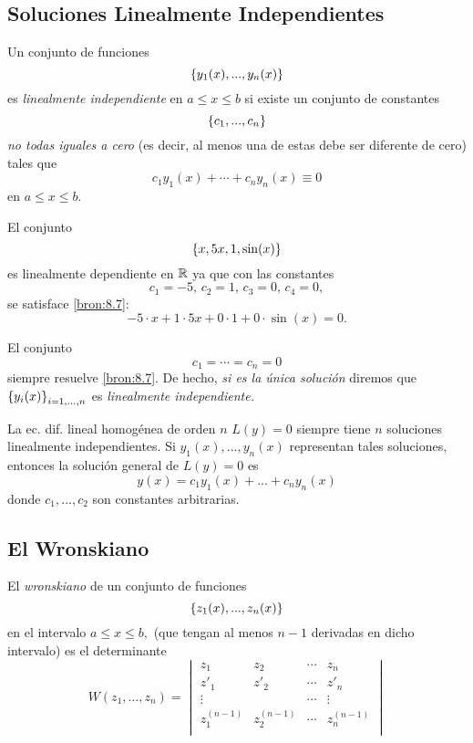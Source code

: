 \subsection{Soluciones Linealmente Independientes}


	Un conjunto de funciones
	$$
	\left\{ y_{1}(x),...,y_{n}(x) \right\}
	$$
	es \emph{linealmente independiente} en $a\leq x \leq b$ si existe un conjunto de constantes
	$$
	\left\{ c_{1}, ..., c_{n} \right\}
	$$ \emph{no todas iguales a cero} (es decir, al menos una de estas debe ser diferente de cero) tales que
	\[
		\label{bron:8.7}
		c_{1}y_{1}(x)+\cdots+c_{n}y_{n}(x)\equiv 0
	\]
	en $a\leq x \leq b.$



	\begin{problema}
		El conjunto
		$$
		\left\{ x, 5x, 1, \sin(x) \right\}
		$$es linealmente dependiente en $\mathbb{R}$ ya que con las constantes
		$$c_{1}=-5, \, c_{2}=1, \, c_{3}=0, \, c_{4}=0,$$ se satisface \eqref{bron:8.7}:
		$$
		-5\cdot x+1\cdot 5x+0\cdot 1+0\cdot \sin(x)=0.
		$$
	\end{problema}
	



	\begin{observacion}
		El conjunto $$c_{1}=\cdots =c_{n}=0$$ siempre resuelve \eqref{bron:8.7}. De hecho, \emph{si es la única soluci\'on}  diremos que $\left\{ y_{i}(x) \right\}_{i=1,...,n}$ es \emph{linealmente independiente.}
	\end{observacion}
	



	La ec. dif. lineal homog\'enea de orden $n$ $L(y)=0$ siempre tiene $n$ soluciones linealmente independientes. Si $y_{1}(x),...,y_{n}(x)$ representan tales soluciones, entonces la soluci\'on general de $L(y)=0$ es
	\[
		\label{bron:8.8}
		y(x)=c_{1}y_{1}(x)+...+c_{n}y_{n}(x)
	\]
	donde $c_{1},...,c_{2}$ son constantes arbitrarias.


\subsection{El Wronskiano}


	El \emph{wronskiano} de un conjunto de funciones
	$$
	\left\{ z_{1}(x),...,z_{n}(x) \right\}
	$$en el intervalo $a\leq x \leq b,$ (que tengan al menos $n-1$ derivadas en dicho intervalo) es el determinante
	$$
	W(z_{1},...,z_{n})=
	\begin{vmatrix}
		z_{1} & z_{2} & \cdots & z_{n} \\
		z'_{1} & z'_{2} & \cdots & z'_{n} \\
		\vdots & & \cdots & \vdots \\
		z^{(n-1)}_{1} & z^{(n-1)}_{2} & \cdots & z^{(n-1)}_{n} \\
	\end{vmatrix}
	$$



